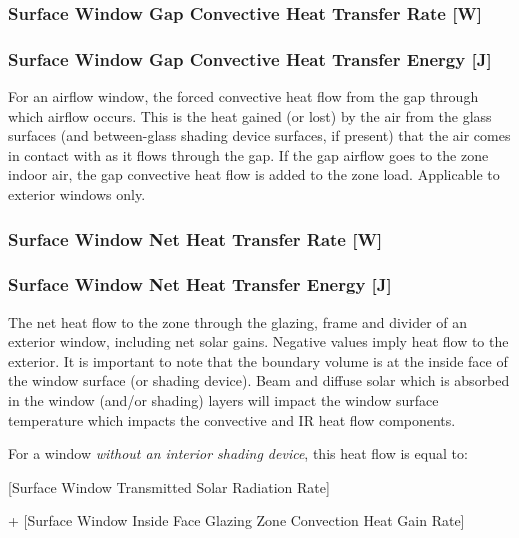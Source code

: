 \subsubsection{Surface Window Gap Convective Heat Transfer Rate {[}W{]}}\label{surface-window-gap-convective-heat-transfer-rate-w}

\subsubsection{Surface Window Gap Convective Heat Transfer Energy {[}J{]}}\label{surface-window-gap-convective-heat-transfer-energy-j}

For an airflow window, the forced convective heat flow from the gap through which airflow occurs. This is the heat gained (or lost) by the air from the glass surfaces (and between-glass shading device surfaces, if present) that the air comes in contact with as it flows through the gap. If the gap airflow goes to the zone indoor air, the gap convective heat flow is added to the zone load. Applicable to exterior windows only.

\subsubsection{Surface Window Net Heat Transfer Rate {[}W{]}}\label{surface-window-net-heat-transfer-rate-w}

\subsubsection{Surface Window Net Heat Transfer Energy {[}J{]}}\label{surface-window-net-heat-transfer-rate-j}

The net heat flow to the zone through the glazing, frame and divider of an exterior window, including net solar gains. Negative values imply heat flow to the exterior. It is important to note that the boundary volume is at the inside face of the window surface (or shading device). Beam and diffuse solar which is absorbed in the window (and/or shading) layers will impact the window surface temperature which impacts the convective and IR heat flow components.

For a window \emph{without an interior shading device}, this heat flow is equal to:

  {[}Surface Window Transmitted Solar Radiation Rate{]}
  
  + {[}Surface Window Inside Face Glazing Zone Convection Heat Gain Rate{]}
  
